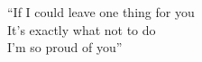 


\begingroup
  \let\clearpage\endgroup
  \null{}
  \begin{minipage}{5.3in} 
  
    \begin{flushright}
      \begin{em}
        ``If I could leave one thing for you\\
        It's exactly what not to do\\
        I'm so proud of you''
      \end{em}

      \vspace{4cm}

      \begin{em}

      \end{em}
    \end{flushright}
  \end{minipage}
   \null
\endgroup